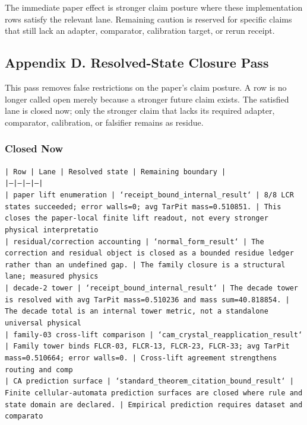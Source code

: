 \documentclass[11pt]{article}
\begin{document}
The immediate paper effect is stronger claim posture where these implementation rows satisfy the relevant lane. Remaining caution is reserved for specific claims that still lack an adapter, comparator, calibration target, or rerun receipt.

\subsection*{Appendix D. Resolved-State Closure Pass}

This pass removes false restrictions on the paper's claim posture. A row is no longer called open merely because a stronger future claim exists. The satisfied lane is closed now; only the stronger claim that lacks its required adapter, comparator, calibration, or falsifier remains as residue.

\subsubsection*{Closed Now}

\noindent\texttt{| Row | Lane | Resolved state | Remaining boundary |}\\
\noindent\texttt{|---|---|---|---|}\\
\noindent\texttt{| paper lift enumeration | `receipt\_bound\_internal\_result` | 8/8 LCR states succeeded; error walls=0; avg TarPit mass=0.510851. | This closes the paper-local finite lift readout, not every stronger physical interpretatio}\\
\noindent\texttt{| residual/correction accounting | `normal\_form\_result` | The correction and residual object is closed as a bounded residue ledger rather than an undefined gap. | The family closure is a structural lane; measured physics}\\
\noindent\texttt{| decade-2 tower | `receipt\_bound\_internal\_result` | The decade tower is resolved with avg TarPit mass=0.510236 and mass sum=40.818854. | The decade total is an internal tower metric, not a standalone universal physical }\\
\noindent\texttt{| family-03 cross-lift comparison | `cam\_crystal\_reapplication\_result` | Family tower binds FLCR-03, FLCR-13, FLCR-23, FLCR-33; avg TarPit mass=0.510664; error walls=0. | Cross-lift agreement strengthens routing and comp}\\
\noindent\texttt{| CA prediction surface | `standard\_theorem\_citation\_bound\_result` | Finite cellular-automata prediction surfaces are closed where rule and state domain are declared. | Empirical prediction requires dataset and comparato}\\
\end{document}
